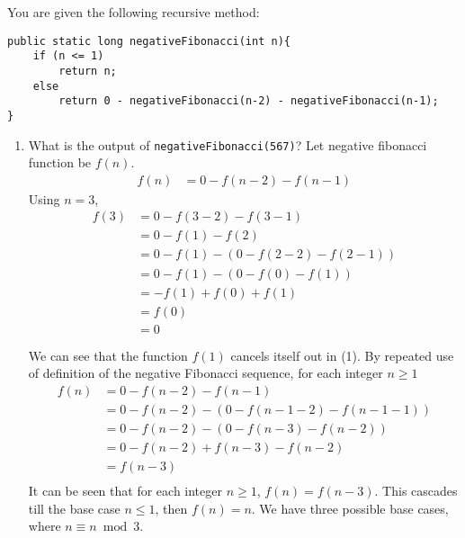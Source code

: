 \item You are given the following recursive method:
\begin{lstlisting}
public static long negativeFibonacci(int n){
    if (n <= 1)
        return n;
    else
        return 0 - negativeFibonacci(n-2) - negativeFibonacci(n-1);
}
\end{lstlisting}
\begin{enumerate}
    \item What is the output of \lstinline{negativeFibonacci(567)}?
          Let negative fibonacci function be $f(n)$.
          \begin{align*}
              f(n) & =0-f(n-2)-f(n-1)
          \end{align*}
          Using $n=3$,
          \begin{align}
              f(3) & =0-f(3-2)-f(3-1)\nonumber          \\
                   & =0-f(1)-f(2)\nonumber              \\
                   & =0-f(1)-(0-f(2-2)-f(2-1))\nonumber \\
                   & =0-f(1)-(0-f(0)-f(1))\nonumber     \\
                   & =-f(1)+f(0)+f(1)                   \\
                   & =f(0)\nonumber                     \\
                   & =0\nonumber                        \\~\nonumber\\\nonumber
          \end{align}
          We can see that the function $f(1)$ cancels itself out in (1). By repeated use of definition of the negative Fibonacci sequence, for each integer $n\ge 1$
          \begin{align*}
              f(n) & =0-f(n-2)-f(n-1)                \\
                   & =0-f(n-2)-(0-f(n-1-2)-f(n-1-1)) \\
                   & =0-f(n-2)-(0-f(n-3)-f(n-2))     \\
                   & =0-f(n-2)+f(n-3)-f(n-2)         \\
                   & =f(n-3)                         \\
          \end{align*}
          It can be seen that for each integer $n\ge 1$, $f(n)=f(n-3)$. This cascades till the base case $n\le 1$, then $f(n)=n$. We have three possible base cases, where $n\equiv n\bmod 3$.

\end{enumerate}
